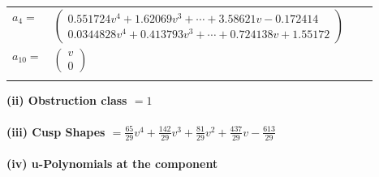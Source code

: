\documentclass[1p]{elsarticle_modified}
\theoremstyle{definition}
\begin{document}
\begin{tabular}{m{7pt} m{180pt} m{7pt} m{180pt} }
\flushright $a_{4}=$&$\begin{pmatrix}0.551724 v^{4}+1.62069 v^{3}+\cdots+3.58621 v-0.172414\\0.0344828 v^{4}+0.413793 v^{3}+\cdots+0.724138 v+1.55172\end{pmatrix}$ \\
\flushright $a_{10}=$&$\begin{pmatrix}v\\0\end{pmatrix}$\\&\end{tabular}
\flushleft \textbf{(ii) Obstruction class $= 1$}\\~\\
\flushleft \textbf{(iii) Cusp Shapes $= \frac{65}{29} v^4+\frac{142}{29} v^3+\frac{81}{29} v^2+\frac{437}{29} v-\frac{613}{29}$}\\~\\
\newpage\renewcommand{\arraystretch}{1}
\flushleft \textbf{(iv) u-Polynomials at the component}\newline \\
\end{document}
